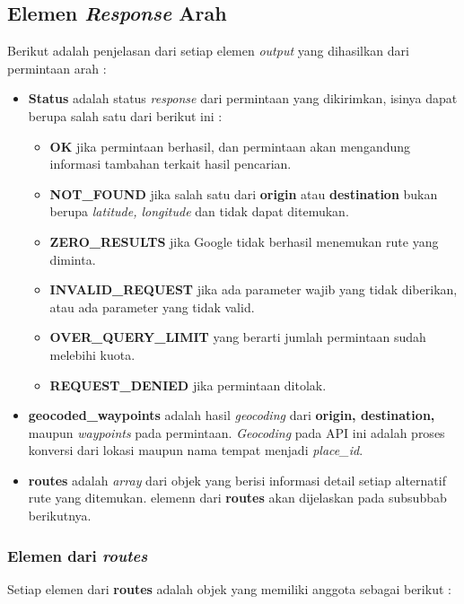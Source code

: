 \subsection{Elemen \textit{Response} Arah}
\label{subsec:elemenresponsegoogledir}

Berikut adalah penjelasan dari setiap elemen \textit{output} yang dihasilkan dari permintaan arah :

\begin{itemize}
	\item \textbf{Status} adalah status \textit{response} dari permintaan yang dikirimkan, isinya dapat berupa salah satu dari berikut ini :
	\begin{itemize}
		\item \textbf{OK} jika permintaan berhasil, dan permintaan akan mengandung informasi tambahan terkait hasil pencarian.
		\item \textbf{NOT\_FOUND} jika salah satu dari \textbf{origin} atau \textbf{destination} bukan berupa \textit{latitude, longitude} dan tidak dapat ditemukan.
		\item \textbf{ZERO\_RESULTS} jika Google tidak berhasil menemukan rute yang diminta.
		\item \textbf{INVALID\_REQUEST} jika ada parameter wajib yang tidak diberikan, atau ada parameter yang tidak valid.
		\item \textbf{OVER\_QUERY\_LIMIT} yang berarti jumlah permintaan sudah melebihi kuota.
		\item \textbf{REQUEST\_DENIED} jika permintaan ditolak.
	\end{itemize}
	\item \textbf{geocoded\_waypoints} adalah hasil \textit{geocoding} dari \textbf{origin, destination,} maupun \textit{waypoints} pada permintaan. \textit{Geocoding} pada API ini adalah proses konversi dari lokasi maupun nama tempat menjadi \textit{place\_id}.
	\item \textbf{routes} adalah \textit{array} dari objek yang berisi informasi detail setiap alternatif rute yang ditemukan. elemenn dari \textbf{routes} akan dijelaskan pada subsubbab berikutnya.
\end{itemize}

\subsubsection{Elemen dari \textit{routes}}
\label{subsubsec:elemenroutes}

Setiap elemen dari \textbf{routes} adalah objek yang memiliki anggota sebagai berikut :

